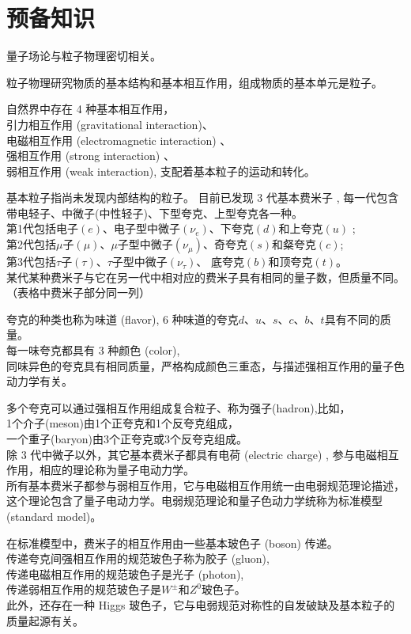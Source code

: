 \section{预备知识}

量子场论与粒子物理密切相关。

粒子物理研究物质的基本结构和基本相互作用，组成物质的基本单元是粒子。

自然界中存在 4 种基本相互作用，
\\引力相互作用 (gravitational interaction)、
\\电磁相互作用 (electromagnetic interaction) 、 
\\强相互作用 (strong interaction) 、
\\弱相互作用 (weak interaction),
支配着基本粒子的运动和转化。

基本粒子指尚未发现内部结构的粒子。
目前已发现 3 代基本费米子 ,
每一代包含带电轻子、中微子(中性轻子)、下型夸克、上型夸克各一种。
\\第1代包括电子$(e)$、电子型中微子$(\nu_e)$、下夸克$(d)$和上夸克$(u)$ ;
\\第2代包括$\mu$子$(\mu)$、$\mu$子型中微子$(\nu_\mu)$、奇夸克$(s)$和粲夸克$(c)$;
\\第3代包括$\tau$子$(\tau)$、$\tau$子型中微子$(\nu_\tau)$、 底夸克$(b)$和顶夸克$(t)$。
\\某代某种费米子与它在另一代中相对应的费米子具有相同的量子数，但质量不同。（表格中费米子部分同一列）

夸克的种类也称为味道 (flavor), 6 种味道的夸克$d$、$u$、$s$、$c$、$b$、$t$具有不同的质量。
\\每一味夸克都具有 3 种颜色 (color),
\\同味异色的夸克具有相同质量，严格构成颜色三重态，与描述强相互作用的量子色动力学有关。

多个夸克可以通过强相互作用组成复合粒子、称为强子(hadron),比如，
\\1个介子(meson)由1个正夸克和1个反夸克组成，
\\一个重子(baryon)由3个正夸克或3个反夸克组成。
\\除 3 代中微子以外，其它基本费米子都具有电荷 (electric charge) , 参与电磁相互作用，相应的理论称为量子电动力学。
\\所有基本费米子都参与弱相互作用，它与电磁相互作用统一由电弱规范理论描述，这个理论包含了量子电动力学。电弱规范理论和量子色动力学统称为标准模型 (standard model)。

在标准模型中，费米子的相互作用由一些基本玻色子 (boson) 传递。
\\传递夸克间强相互作用的规范玻色子称为胶子 (gluon),
\\传递电磁相互作用的规范玻色子是光子 (photon),
\\传递弱相互作用的规范玻色子是$W^\pm$和$Z^0$玻色子。
\\此外，还存在一种 Higgs 玻色子，它与电弱规范对称性的自发破缺及基本粒子的质量起源有关。

